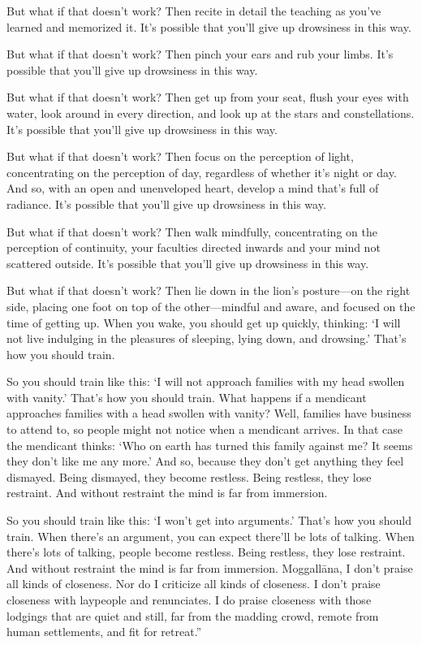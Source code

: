 \documentclass[12pt,openany]{book}%
\begin{document}
But what if that doesn’t work? Then recite in detail the teaching as you’ve learned and memorized it. It’s possible that you’ll give up drowsiness in this way. 

But what if that doesn’t work? Then pinch your ears and rub your limbs. It’s possible that you’ll give up drowsiness in this way. 

But what if that doesn’t work? Then get up from your seat, flush your eyes with water, look around in every direction, and look up at the stars and constellations. It’s possible that you’ll give up drowsiness in this way. 

But what if that doesn’t work? Then focus on the perception of light, concentrating on the perception of day, regardless of whether it’s night or day. And so, with an open and unenveloped heart, develop a mind that’s full of radiance. It’s possible that you’ll give up drowsiness in this way. 

But what if that doesn’t work? Then walk mindfully, concentrating on the perception of continuity, your faculties directed inwards and your mind not scattered outside. It’s possible that you’ll give up drowsiness in this way. 

But what if that doesn’t work? Then lie down in the lion’s posture—on the right side, placing one foot on top of the other—mindful and aware, and focused on the time of getting up. When you wake, you should get up quickly, thinking: ‘I will not live indulging in the pleasures of sleeping, lying down, and drowsing.’ That’s how you should train. 

So you should train like this: ‘I will not approach families with my head swollen with vanity.’ That’s how you should train. What happens if a mendicant approaches families with a head swollen with vanity? Well, families have business to attend to, so people might not notice when a mendicant arrives. In that case the mendicant thinks: ‘Who on earth has turned this family against me? It seems they don’t like me any more.’ And so, because they don’t get anything they feel dismayed. Being dismayed, they become restless. Being restless, they lose restraint. And without restraint the mind is far from immersion. 

So you should train like this: ‘I won’t get into arguments.’ That’s how you should train. When there’s an argument, you can expect there’ll be lots of talking. When there’s lots of talking, people become restless. Being restless, they lose restraint. And without restraint the mind is far from immersion. \textsanskrit{Moggallāna}, I don’t praise all kinds of closeness. Nor do I criticize all kinds of closeness. I don’t praise closeness with laypeople and renunciates. I do praise closeness with those lodgings that are quiet and still, far from the madding crowd, remote from human settlements, and fit for retreat.” 
\end{document}
